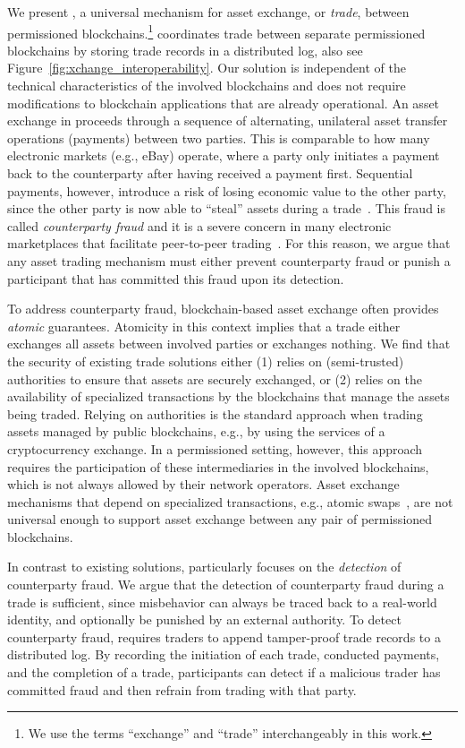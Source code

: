 We present \emph{\ModelName{}}, a universal mechanism for asset exchange, or \emph{trade}, between permissioned blockchains.\footnote{We use the terms \enquote{exchange} and \enquote{trade} interchangeably in this work.}
\ModelName{} coordinates trade between separate permissioned blockchains by storing trade records in a distributed log, also see Figure~\ref{fig:xchange_interoperability}.
Our solution is independent of the technical characteristics of the involved blockchains and does not require modifications to blockchain applications that are already operational.
An asset exchange in \ModelName{} proceeds through a sequence of alternating, unilateral asset transfer operations (payments) between two parties.
This is comparable to how many electronic markets (e.g., eBay) operate, where a party only initiates a payment back to the counterparty after having received a payment first.
Sequential payments, however, introduce a risk of losing economic value to the other party, since the other party is now able to \enquote{steal} assets during a trade~\cite{koens2019assessing}.
This fraud is called \emph{counterparty fraud} and it is a severe concern in many electronic marketplaces that facilitate peer-to-peer trading~\cite{peters2016understanding}.
For this reason, we argue that any asset trading mechanism must either prevent counterparty fraud or punish a participant that has committed this fraud upon its detection.

To address counterparty fraud, blockchain-based asset exchange often provides \emph{atomic} guarantees.
Atomicity in this context implies that a trade either exchanges all assets between involved parties or exchanges nothing.
We find that the security of existing trade solutions either (1) relies on (semi-trusted) authorities to ensure that assets are securely exchanged, or (2) relies on the availability of specialized transactions by the blockchains that manage the assets being traded.
Relying on authorities is the standard approach when trading assets managed by public blockchains, e.g., by using the services of a cryptocurrency exchange.
In a permissioned setting, however, this approach requires the participation of these intermediaries in the involved blockchains, which is not always allowed by their network operators.
Asset exchange mechanisms that depend on specialized transactions, e.g., atomic swaps~\cite{nolan2016atomic}, are not universal enough to support asset exchange between any pair of permissioned blockchains.

In contrast to existing solutions, \ModelName{} particularly focuses on the \emph{detection} of counterparty fraud.
We argue that the detection of counterparty fraud during a trade is sufficient, since misbehavior can always be traced back to a real-world identity, and optionally be punished by an external authority.
To detect counterparty fraud, \ModelName{} requires traders to append tamper-proof trade records to a distributed log.
By recording the initiation of each trade, conducted payments, and the completion of a trade, participants can detect if a malicious trader has committed fraud and then refrain from trading with that party.

